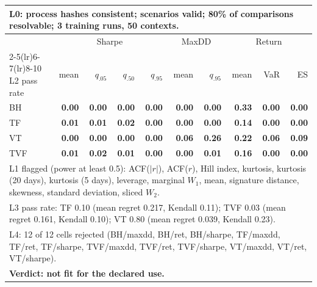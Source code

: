 \begin{tabular}{lrrrrrrrrr}
\toprule
\multicolumn{10}{p{13.5cm}}{L0: process hashes consistent; scenarios valid; 80\% of comparisons resolvable; 3 training runs, 50 contexts.} \\
\midrule
 & \multicolumn{4}{c}{Sharpe} & \multicolumn{2}{c}{MaxDD} & \multicolumn{3}{c}{Return} \\
\cmidrule(lr){2-5}\cmidrule(lr){6-7}\cmidrule(lr){8-10}
L2 pass rate & mean & $q_{.05}$ & $q_{.50}$ & $q_{.95}$ & mean & $q_{.95}$ & mean & VaR & ES \\
\midrule
BH & \textbf{0.00} & \textbf{0.00} & \textbf{0.00} & \textbf{0.00} & \textbf{0.00} & \textbf{0.00} & \textbf{0.33} & \textbf{0.00} & \textbf{0.00} \\
TF & \textbf{0.01} & \textbf{0.01} & \textbf{0.02} & \textbf{0.00} & \textbf{0.00} & \textbf{0.00} & \textbf{0.14} & \textbf{0.00} & \textbf{0.00} \\
VT & \textbf{0.00} & \textbf{0.00} & \textbf{0.00} & \textbf{0.00} & \textbf{0.06} & \textbf{0.26} & \textbf{0.22} & \textbf{0.06} & \textbf{0.09} \\
TVF & \textbf{0.01} & \textbf{0.02} & \textbf{0.01} & \textbf{0.00} & \textbf{0.00} & \textbf{0.01} & \textbf{0.16} & \textbf{0.00} & \textbf{0.00} \\
\midrule
\multicolumn{10}{p{13.5cm}}{L1 flagged (power at least 0.5): ACF($|r|$), ACF($r$), Hill index, kurtosis, kurtosis (20 days), kurtosis (5 days), leverage, marginal $W_1$, mean, signature distance, skewness, standard deviation, sliced $W_2$.} \\
\multicolumn{10}{p{13.5cm}}{L3 pass rate: TF 0.10 (mean regret 0.217, Kendall 0.11); TVF 0.03 (mean regret 0.161, Kendall 0.10); VT 0.80 (mean regret 0.039, Kendall 0.23).} \\
\multicolumn{10}{p{13.5cm}}{L4: 12 of 12 cells rejected (BH/maxdd, BH/ret, BH/sharpe, TF/maxdd, TF/ret, TF/sharpe, TVF/maxdd, TVF/ret, TVF/sharpe, VT/maxdd, VT/ret, VT/sharpe).} \\
\multicolumn{10}{p{13.5cm}}{\textbf{Verdict: not fit for the declared use.}} \\
\bottomrule
\end{tabular}
